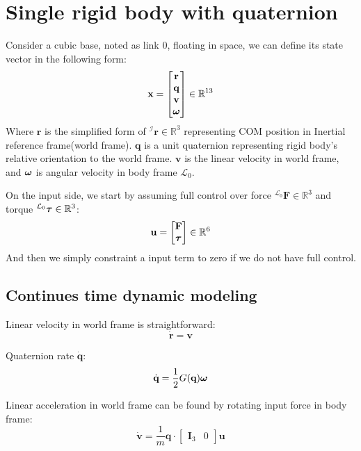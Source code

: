 \section{Single rigid body with quaternion}

Consider a cubic base, noted as link 0, floating in space, we can define its state vector in the following form:
\begin{equation}
    \textbf{x} = \begin{bmatrix}
        \textbf{r} \\  \textbf{q} \\ \textbf{v} \\ \text{\boldmath$\omega$}
    \end{bmatrix} \in \mathbb{R}^{13}
\end{equation}
Where $\textbf{r}$ is the simplified form of $^{\mathcal{I}}\textbf{r}\in \mathbb{R}^3$ representing COM position in Inertial reference frame(world frame). $\textbf{q}$ is a unit quaternion representing rigid body's relative orientation to the world frame. $\textbf{v}$ is the linear velocity in world frame, and $\text{\boldmath$\omega$}$ is angular velocity in body frame $\mathcal{L}_0$.

On the input side, we start by assuming full control over force $^{\mathcal{L}_0}\textbf{F} \in \mathbb{R}^3$ and torque $^{\mathcal{L}_0}\text{\boldmath$\tau$} \in \mathbb{R}^3$:
\begin{equation}
    \textbf{u} = \begin{bmatrix}
        \textbf{F} \\ \text{\boldmath$\tau$}
    \end{bmatrix} \in \mathbb{R}^{6}
\end{equation}
And then we simply constraint a input term to zero if we do not have full control.
\subsection{Continues time dynamic modeling}
Linear velocity in world frame is straightforward:
\begin{equation}
    \dot{\textbf{r}} = \textbf{v}
\end{equation}

Quaternion rate $\dot{\textbf{q}}$:
\begin{equation}
    \dot{\textbf{q}} = \frac{1}{2}G(\textbf{q})\text{\boldmath$\omega$}
\end{equation}

Linear acceleration in world frame can be found by rotating input force in body frame:
\begin{equation}
    \dot{\textbf{v}} = \frac{1}{m}\textbf{q} \cdot \begin{bmatrix}
        \textbf{I}_3 & 0
    \end{bmatrix} \textbf{u}
\end{equation}

